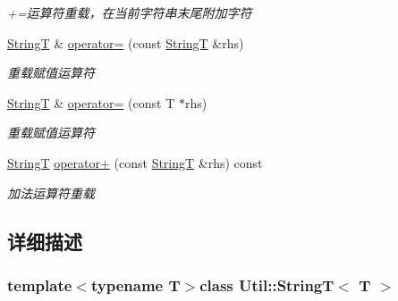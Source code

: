 \begin{DoxyCompactItemize}
\begin{DoxyCompactList}\small\item\em +=运算符重载，在当前字符串末尾附加字符 \end{DoxyCompactList}\item 
\hypertarget{class_util_1_1_string_t_a070230002e6ac34196bc428f29b124ce}{\hyperlink{class_util_1_1_string_t}{String\-T} \& \hyperlink{class_util_1_1_string_t_a070230002e6ac34196bc428f29b124ce}{operator=} (const \hyperlink{class_util_1_1_string_t}{String\-T} \&rhs)}\label{class_util_1_1_string_t_a070230002e6ac34196bc428f29b124ce}

\begin{DoxyCompactList}\small\item\em 重载赋值运算符 \end{DoxyCompactList}\item 
\hypertarget{class_util_1_1_string_t_a5df6d9b5a666b594be55d69487859bc4}{\hyperlink{class_util_1_1_string_t}{String\-T} \& \hyperlink{class_util_1_1_string_t_a5df6d9b5a666b594be55d69487859bc4}{operator=} (const T $\ast$rhs)}\label{class_util_1_1_string_t_a5df6d9b5a666b594be55d69487859bc4}

\begin{DoxyCompactList}\small\item\em 重载赋值运算符 \end{DoxyCompactList}\item 
\hypertarget{class_util_1_1_string_t_ad4ab5e162578246bdcb450b6348a2566}{\hyperlink{class_util_1_1_string_t}{String\-T} \hyperlink{class_util_1_1_string_t_ad4ab5e162578246bdcb450b6348a2566}{operator+} (const \hyperlink{class_util_1_1_string_t}{String\-T} \&rhs) const }\label{class_util_1_1_string_t_ad4ab5e162578246bdcb450b6348a2566}

\begin{DoxyCompactList}\small\item\em 加法运算符重载 \end{DoxyCompactList}\end{DoxyCompactItemize}


\subsection{详细描述}
\subsubsection*{template$<$typename T$>$class Util\-::\-String\-T$<$ T $>$}



